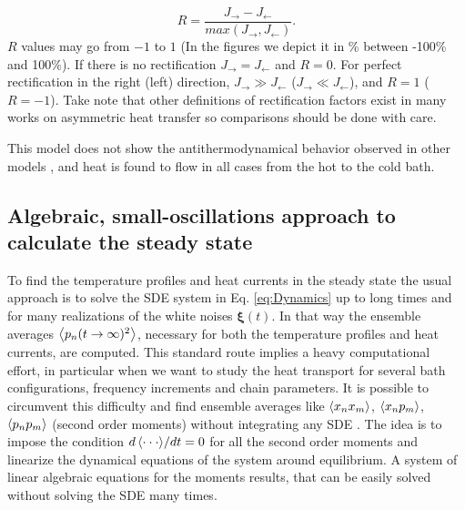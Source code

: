 %
\begin{equation}
    R = \frac{ J_\rightarrow - J_\leftarrow}{max(J_\rightarrow,J_\leftarrow)}.
    \label{eq:R_Factor}
\end{equation}
%
$R$ values may go from $-1$ to $1$ (In the figures we depict it in \% between -100\% and 100\%). If there is no rectification $J_\rightarrow = J_\leftarrow $ and $R=0$. For perfect rectification in the right (left) direction, $J_\rightarrow \gg J_\leftarrow$ ($J_\rightarrow \ll J_\leftarrow$), and $R = 1$ ($R = -1$).
Take note that other  definitions of rectification factors exist in many works
on asymmetric heat transfer so comparisons should be done with care.
%

This model does not show the antithermodynamical behavior  observed in other models
\cite{De-Chiara2018,Levy2014}, and heat is found to flow in all cases from the hot to the
cold bath.
%
%
%
\subsection{Algebraic, small-oscillations approach to calculate the steady state\label{steadyState}}
%
%
%
%
To find the temperature profiles and heat currents in the steady state the usual approach is to solve the SDE system in Eq. \eqref{eq:Dynamics} up to long times  and for many realizations of the white noises $\bm\xi (t)$. In that way the ensemble averages $\expval{p_n(t \to \infty)^2}$, necessary for both the temperature profiles and heat currents, are computed. This standard route implies a heavy computational effort, in particular  when we want to study the heat transport for several bath configurations, frequency increments and chain parameters. It is possible to circumvent this difficulty and find ensemble averages like $\expval{x_n x_m}$, $\expval{x_n p_m}$, $\expval{p_n p_m}$ (second order moments) without integrating any SDE \cite{Sarkka2019}. The idea is to impose the condition ${d\expval{\cdot\cdot\cdot}}/{dt} = 0$ for all the second order moments and linearize the dynamical equations of the system around equilibrium.
A system of linear algebraic equations for the moments results, that can be easily solved without solving the SDE many times.


